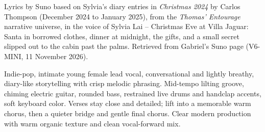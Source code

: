 
\label{sec:a-cabin-waiting-past-the-palms}
\begin{notes}
Lyrics by Suno based on Sylvia's diary entries in \emph{Christmas 2024} by Carlos Thompson (December 2024 to January 2025), from the \emph{Thomas' Entourage} narrative universe, in the voice of Sylvia Lai -- Christmas Eve at Villa Jaguar: Santa in borrowed clothes, dinner at midnight, the gifts, and a small secret slipped out to the cabin past the palms. Retrieved from Gabriel's Suno page (V6-MINI, 11 November 2026).
\end{notes}
\begin{style}
Indie-pop, intimate young female lead vocal, conversational and lightly breathy, diary-like storytelling with crisp melodic phrasing. Mid-tempo lilting groove, chiming electric guitar, rounded bass, restrained live drums and handclap accents, soft keyboard color. Verses stay close and detailed; lift into a memorable warm chorus, then a quieter bridge and gentle final chorus. Clear modern production with warm organic texture and clean vocal-forward mix.
\end{style}
